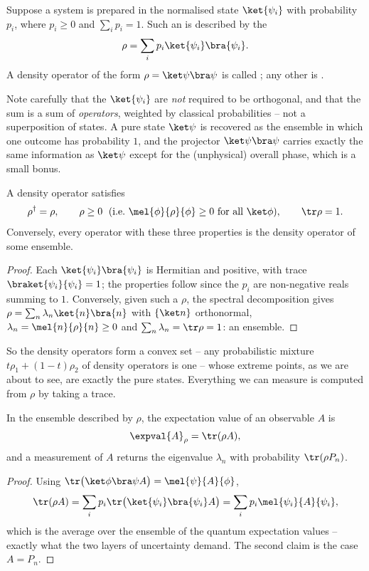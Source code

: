 \begin{definition}
    Suppose a system is prepared in the normalised state $\ket{\psi_i}$ with probability $p_i$, where $p_i \geq 0$ and $\sum_i p_i = 1$. Such an  is described by the 
    $$
    \rho = \sum_i p_i \ket{\psi_i}\bra{\psi_i}.
    $$
    A density operator of the form $\rho = \ket\psi\bra\psi$ is called ; any other is .
\end{definition}

Note carefully that the $\ket{\psi_i}$ are \emph{not} required to be orthogonal, and that the sum is a sum of \emph{operators}, weighted by classical probabilities -- not a superposition of states. A pure state $\ket\psi$ is recovered as the ensemble in which one outcome has probability $1$, and the projector $\ket\psi\bra\psi$ carries exactly the same information as $\ket\psi$ except for the (unphysical) overall phase, which is a small bonus.

\begin{proposition}
    A density operator satisfies
    $$
    \rho^\dagger = \rho, \qquad \rho \geq 0 \; \text{ (i.e.\ } \mel{\phi}{\rho}{\phi}\geq0 \text{ for all } \ket\phi), \qquad \tr \rho = 1.
    $$
    Conversely, every operator with these three properties is the density operator of some ensemble.
\end{proposition}
\begin{proof}
    Each $\ket{\psi_i}\bra{\psi_i}$ is Hermitian and positive, with trace $\braket{\psi_i}{\psi_i} = 1$; the properties follow since the $p_i$ are non-negative reals summing to $1$. Conversely, given such a $\rho$, the spectral decomposition gives $\rho = \sum_n \lambda_n \ket{n}\bra{n}$ with $\{\ket n\}$ orthonormal, $\lambda_n = \mel{n}{\rho}{n}\geq0$ and $\sum_n\lambda_n = \tr\rho = 1$: an ensemble.
\end{proof}

So the density operators form a convex set -- any probabilistic mixture $t\rho_1 + (1-t)\rho_2$ of density operators is one -- whose extreme points, as we are about to see, are exactly the pure states. Everything we can measure is computed from $\rho$ by taking a trace.

\begin{proposition}
    In the ensemble described by $\rho$, the expectation value of an observable $A$ is
    $$
    \expval{A}_\rho = \tr(\rho A),
    $$
    and a measurement of $A$ returns the eigenvalue $\lambda_n$ with probability $\tr(\rho P_n)$.
\end{proposition}
\begin{proof}
    Using $\tr\big(\ket\phi\bra\psi A\big) = \mel{\psi}{A}{\phi}$,
    $$
    \tr(\rho A) = \sum_i p_i \tr\big( \ket{\psi_i}\bra{\psi_i}A \big) = \sum_i p_i \mel{\psi_i}{A}{\psi_i},
    $$
    which is the average over the ensemble of the quantum expectation values -- exactly what the two layers of uncertainty demand. The second claim is the case $A = P_n$.
\end{proof}

